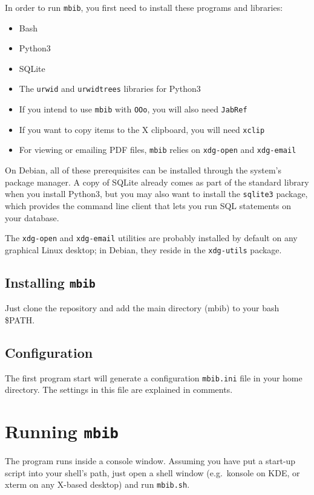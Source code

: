 \documentclass[10pt]{article}
\newcommand{\mbib}{\texttt{mbib}\xspace}
\newcommand{\jabref}{\texttt{JabRef}\xspace}
\newcommand*{\ooo}{\texttt{OOo}\xspace}
\begin{document}
In order to run \mbib, you first need to install these programs and libraries:

\begin{itemize}
\item Bash
\item Python3 
\item SQLite
\item The \texttt{urwid} and \texttt{urwidtrees} libraries for Python3
\item If you intend to use \mbib with \ooo, you will also need \jabref
\item If you want to copy items to the X clipboard, you will need \texttt{xclip}
\item For viewing or emailing PDF files, \mbib relies on \texttt{xdg-open} and \texttt{xdg-email}
\end{itemize}

\noindent On Debian, all of these prerequisites can be installed through the system's package manager. A copy of SQLite already comes as part of the standard library when you install Python3, but you may also want to install the \texttt{sqlite3} package, which provides the command line client that lets you run SQL statements on your database. 

The \texttt{xdg-open} and \texttt{xdg-email} utilities are probably installed by default on any graphical Linux desktop; in Debian, they reside in the \texttt{xdg-utils} package.

\subsection{Installing \mbib}

Just clone the repository and add the main directory (mbib) to your bash \$PATH. 

\subsection{Configuration}

The first program start will generate a configuration \texttt{mbib.ini} file in your home directory. The settings in this file are explained in comments. 

\section{Running \mbib}

The program runs inside a console window. Assuming you have put a start-up script into your shell's path, just open a shell window (e.g.\ konsole on KDE, or xterm on any X-based desktop) and run \texttt{mbib.sh}.
\end{document}
